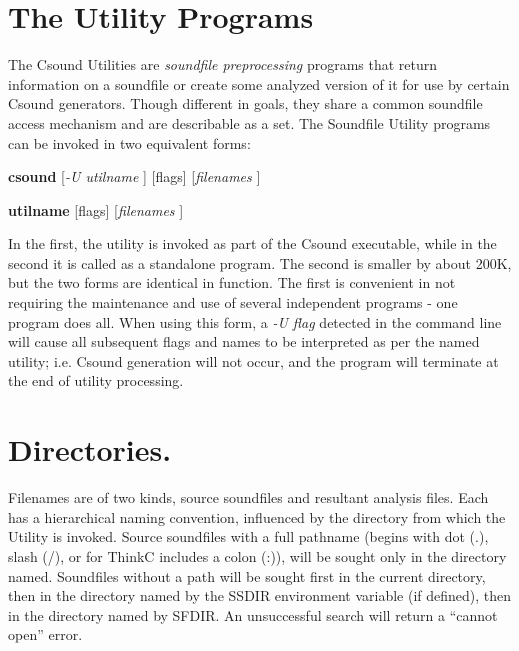 \begin{comment}
\documentclass[10pt]{article}
\usepackage{fullpage, graphicx, url}
\setlength{\parskip}{1ex}
\setlength{\parindent}{0ex}
\title{The Utility Programs}



\begin{tabular}{ccc}
The Alternative Csound Reference Manual & & \\
Previous & &Next

\end{tabular}

\end{comment}
\section{The Utility Programs}


  The Csound Utilities are \emph{soundfile preprocessing}
 programs that return information on a soundfile or create some analyzed version of it for use by certain Csound generators. Though different in goals, they share a common soundfile access mechanism and are describable as a set. The Soundfile Utility programs can be invoked in two equivalent forms: 


 \textbf{csound}
 [\emph{-U utilname}
] [flags] [\emph{filenames}
]


 \textbf{utilname}
 [flags] [\emph{filenames}
]


  In the first, the utility is invoked as part of the Csound executable, while in the second it is called as a standalone program. The second is smaller by about 200K, but the two forms are identical in function. The first is convenient in not requiring the maintenance and use of several independent programs - one program does all. When using this form, a \emph{-U flag}
 detected in the command line will cause all subsequent flags and names to be interpreted as per the named utility; i.e. Csound generation will not occur, and the program will terminate at the end of utility processing. 
\section{Directories.}


  Filenames are of two kinds, source soundfiles and resultant analysis files. Each has a hierarchical naming convention, influenced by the directory from which the Utility is invoked. Source soundfiles with a full pathname (begins with dot (.), slash (/), or for ThinkC includes a colon (:)), will be sought only in the directory named. Soundfiles without a path will be sought first in the current directory, then in the directory named by the SSDIR environment variable (if defined), then in the directory named by SFDIR. An unsuccessful search will return a ``cannot open'' error. 


